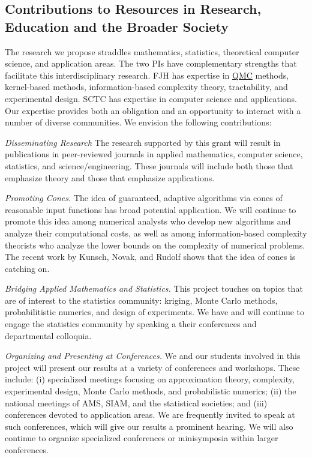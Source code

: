 \documentclass[11pt]{NSFamsart}
\newcommand{\QMC}{\hyperlink{QMClink}{QMC}\xspace}
\begin{document}
\subsection{Contributions to Resources in Research, Education and the Broader Society} 
\label{BroaderTwoSec}

The research we propose straddles mathematics, statistics, theoretical computer science, and 
application areas.  The two PIs have complementary strengths that facilitate this interdisciplinary research.  FJH 
has expertise in \QMC methods, kernel-based methods, information-based complexity 
theory, tractability, and experimental design. SCTC has expertise in computer science and applications.  Our 
expertise provides both an obligation and an opportunity to interact with a number of diverse 
communities. We envision the following contributions:

\emph{Disseminating Research}
The research supported by this grant will result in publications in peer-reviewed journals in applied
mathematics, computer science, statistics, and science/engineering. These 
journals will include both those that emphasize theory and those that emphasize applications.

\emph{Promoting Cones.} The idea of guaranteed, adaptive algorithms via cones of reasonable input 
functions has broad potential application.  We will continue to promote this idea among numerical analysts 
who 
develop new algorithms and analyze their computational costs, as well as among information-based 
complexity theorists who analyze the lower bounds on the complexity of numerical problems.  The recent work by Kunsch, Novak, and Rudolf \cite{KunEtal19a} shows that the idea of cones is catching on.

\emph{Bridging Applied Mathematics and Statistics.}
This project touches on topics that are of interest to the statistics community: kriging, Monte Carlo methods, probabilitistic numerics, and design of experiments.  We have and will continue to engage the statistics community 
by speaking a their conferences and departmental colloquia.

\emph{Organizing and Presenting at Conferences.}
We and our students involved in this project will present our results at a variety of conferences and workshops.  These include: (i) specialized meetings focusing on approximation theory, complexity, 
experimental design, Monte Carlo methods, and probabilistic numerics; (ii) the national meetings of AMS, SIAM, and the 
statistical societies; and (iii) conferences devoted to application areas.  We are frequently invited to 
speak at such conferences, which will give our results a prominent hearing. We will also continue to 
organize specialized conferences or minisymposia within larger conferences.
\end{document}
